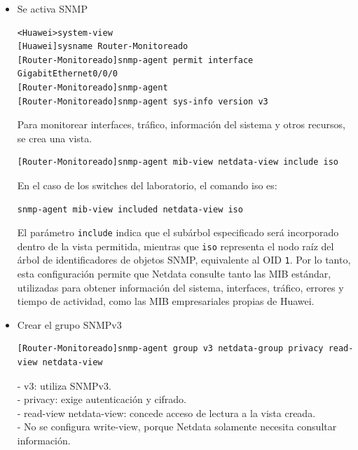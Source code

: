 \begin{itemize}
  \item Se activa SNMP

\begin{lstlisting}[style=terminal]
<Huawei>system-view
[Huawei]sysname Router-Monitoreado
[Router-Monitoreado]snmp-agent permit interface GigabitEthernet0/0/0
[Router-Monitoreado]snmp-agent
[Router-Monitoreado]snmp-agent sys-info version v3

\end{lstlisting}

Para monitorear interfaces, tráfico, información del sistema y otros recursos, se crea una vista.
\begin{lstlisting}[style=terminal]
[Router-Monitoreado]snmp-agent mib-view netdata-view include iso

\end{lstlisting}

En el caso de los switches del laboratorio, el comando iso es:
\begin{lstlisting}[style=terminal]
snmp-agent mib-view included netdata-view iso

\end{lstlisting}

El parámetro \texttt{include} indica que el subárbol especificado será
incorporado dentro de la vista permitida, mientras que \texttt{iso} representa
el nodo raíz del árbol de identificadores de objetos SNMP, equivalente al OID
\texttt{1}. Por lo tanto, esta configuración permite que Netdata consulte tanto
las MIB estándar, utilizadas para obtener información del sistema, interfaces,
tráfico, errores y tiempo de actividad, como las MIB empresariales propias de
Huawei.




\item Crear el grupo SNMPv3



\begin{lstlisting}[style=terminal]
[Router-Monitoreado]snmp-agent group v3 netdata-group privacy read-view netdata-view
\end{lstlisting}

- v3: utiliza SNMPv3.\\
- privacy: exige autenticación y cifrado.\\
- read-view netdata-view: concede acceso de lectura a la vista creada. \\
- No se configura write-view, porque Netdata solamente necesita consultar información. \\



\end{itemize}
